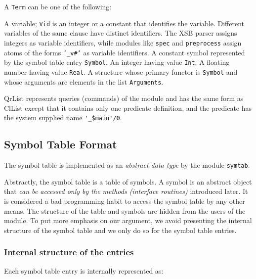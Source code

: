 A {\tt Term} can be one of the following:

\begin{description}
	A variable; {\tt Vid} is an integer or a constant that identifies
	the variable.  Different variables of the same clause have distinct
	identifiers.  The XSB parser assigns integers as variable identifiers,
	while modules like {\tt spec} and {\tt preprocess} assign atoms of
	the forms {\tt '\_v\#'} as variable identifiers.
	A constant symbol represented by the symbol table entry {\tt Symbol}.
	An integer having value {\tt Int}.
	A floating number having value {\tt Real}.
	A structure whose primary functor is {\tt Symbol} and whose
	arguments are elements in the list {\tt Arguments}.
\end{description}

{\sf QrList} represents queries (commands) of the module and has the
same form as {\sf ClList} except that it contains only one predicate
definition, and the predicate has the system supplied name \verb+'_$main'/0+.

\subsection{Symbol Table Format}

The symbol table is implemented as an {\em abstract data type} by the
module {\tt symtab}.

Abstractly, the symbol table is a table of symbols. A symbol
is an abstract object that {\em can be accessed only by the methods
(interface routines)} introduced later.  It is considered a bad
programming habit to access the symbol table by any other means. 
The structure of the table and symbols are hidden from the users
of the module.  To put more emphasis on our argument, we avoid
presenting the internal structure of the symbol table and we only
do so for the symbol table entries.

\subsubsection{Internal structure of the entries}

Each symbol table entry is internally represented as:


